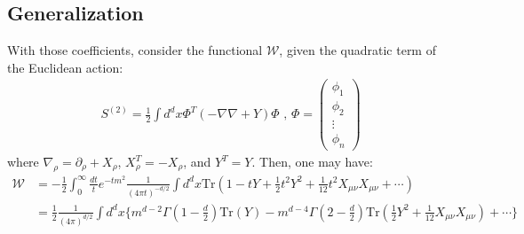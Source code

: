 \documentclass[fleqn]{article}
\begin{document}
\subsection{Generalization}
With those coefficients, consider the functional $\mathcal{W}$, given the quadratic term of the Euclidean action:
\begin{align}
S^{(2)} = \frac{1}{2} \int d^{d}x \Phi^{T} (-\nabla \nabla + Y) \Phi \text{   ,   } \Phi  = \begin{pmatrix}
\phi_{1} \\
\phi_{2} \\
\vdots \\
\phi_{n}
\end{pmatrix}
\end{align}
where $\nabla_{\rho} = \partial _{\rho} + X_{\rho}$, $X_{\rho}^{T} = -X_{\rho}$, and $Y^{T} = Y$.
Then, one may have:
\begin{align}
\mathcal{W} & = -\frac{1}{2} \int _{0}^{\infty} \frac{dt}{t} e^{-tm^{2}}\frac{1}{(4\pi t)^{-d/2}} \int d^{d}x \text{Tr} (1 - tY + \frac{1}{2} t^{2} Y^{2} + \frac{1}{12} t^{2} X_{\mu \nu} X_{\mu \nu} + \cdots ) \nonumber \\
&= \frac{1} {2} \frac{1}{(4\pi)^{d/2}}\int d^{d}x \lbrace m^{d-2} \Gamma(1-\frac{d}{2}) \text{Tr} (Y) - m^{d-4} \Gamma(2-\frac{d}{2}) \text{Tr}(\frac{1}{2}Y^{2} + \frac{1}{12} X_{\mu \nu} X_{\mu \nu}) + \cdots   \rbrace
\end{align}
\end{document}
